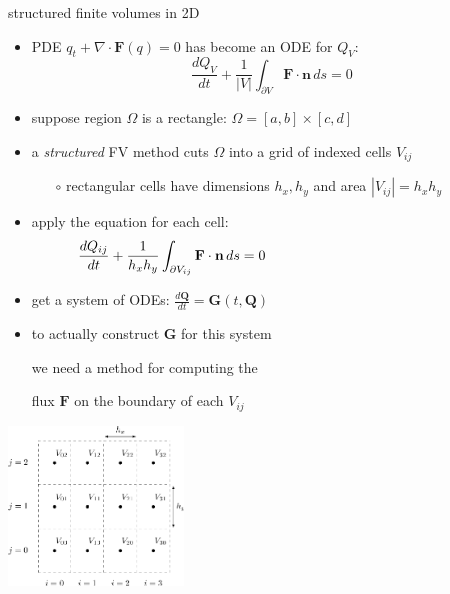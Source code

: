 \documentclass[10pt,dvipsnames,usepdftitle=false,
hyperref={pdftitle = {Finite volume methods},
    pdfauthor = {Ed Bueler}}]{beamer}
\newcommand{\bn}{\mathbf{n}}
\newcommand{\bF}{\mathbf{F}}
\newcommand{\bG}{\mathbf{G}}
\newcommand{\bQ}{\mathbf{Q}}
\newcommand{\Div}{\nabla\cdot}
\newcommand{\ds}{\displaystyle}
\begin{document}
\begin{frame}{structured finite volumes in 2D}

\begin{itemize}
\item PDE $q_t + \Div \bF(q) = 0$ has become an ODE for $Q_V$:
    $$\frac{dQ_V}{dt} + \frac{1}{|V|} \int_{\partial V} \bF\cdot \bn\,ds = 0$$
\item suppose region $\Omega$ is a rectangle: \quad $\Omega = [a,b] \times [c,d]$
\item a \emph{structured} FV method cuts $\Omega$ into a grid of indexed cells $V_{ij}$
    \begin{itemize}
    \item[$\circ$] rectangular cells have dimensions $h_x,h_y$ and area $|V_{ij}| = h_x h_y$
    \end{itemize}
\item apply the equation for each cell:
    $$\frac{dQ_{ij}}{dt} + \frac{1}{h_x h_y} \int_{\partial V_{ij}} \bF\cdot \bn\,ds = 0 \hspace{50mm}$$
\item get a system of ODEs: $\ds \frac{d\bQ}{dt} = \bG(t,\bQ)$
\item to actually construct $\bG$ for this system

we need a method for computing the

flux $\bF$ on the boundary of each $V_{ij}$
\end{itemize}

\vspace{-40mm}
\hfill \includegraphics[width=0.35\textwidth]{figs/bueler11p1}
\end{frame}
\end{document}

